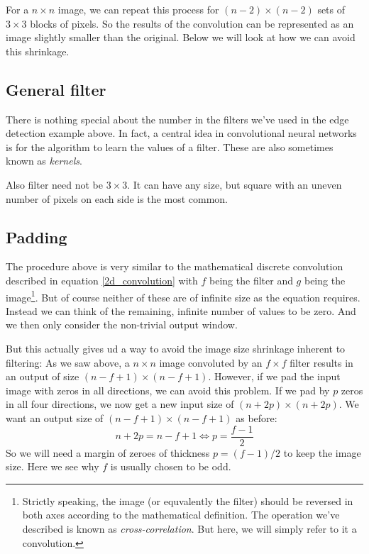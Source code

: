 \documentclass[12pt, a4paper]{article}
\numberwithin{equation}{section}
\begin{document}
For a $n\times n$ image, we can repeat this process for $(n-2)\times(n-2)$ sets of $3\times 3$ blocks of pixels. So the results of the convolution can be represented as an image slightly smaller than the original. Below we will look at how we can avoid this shrinkage.

\subsection{General filter}
There is nothing special about the number in the filters we've used in the edge detection example above. In fact, a central idea in convolutional neural networks is for the algorithm to learn the values of a filter. These are also sometimes known as \textit{kernels}.

Also filter need not be $3\times 3$. It can have any size, but square with an uneven number of pixels on each side is the most common.

\subsection{Padding}
The procedure above is very similar to the mathematical discrete convolution described in equation \ref{2d_convolution} with $f$ being the filter and $g$ being the image\footnote{Strictly speaking, the image (or equvalently the filter) should be reversed in both axes according to the mathematical definition. The operation we've described is known as \textit{cross-correlation}. But here, we will simply refer to it a convolution.}. But of course neither of these are of infinite size as the equation requires. Instead we can think of the remaining, infinite number of values to be zero. And we then only consider the non-trivial output window.

But this actually gives ud a way to avoid the image size shrinkage inherent to filtering: As we saw above, a $n\times n$ image convoluted by an $f\times f$ filter results in an output of size $(n-f+1)\times(n-f+1)$. However, if we pad the input image with zeros in all directions, we can avoid this problem. If we pad by $p$ zeros in all four directions, we now get a new input size of $(n+2p)\times(n+2p)$. We want an output size of $(n-f+1)\times(n-f+1)$ as before:
\begin{equation}
n+2p=n-f+1\Leftrightarrow p=\frac{f-1}{2}
\end{equation}
So we will need a margin of zeroes of thickness $p=(f-1)/2$ to keep the image size. Here we see why $f$ is usually chosen to be odd.
\end{document}
